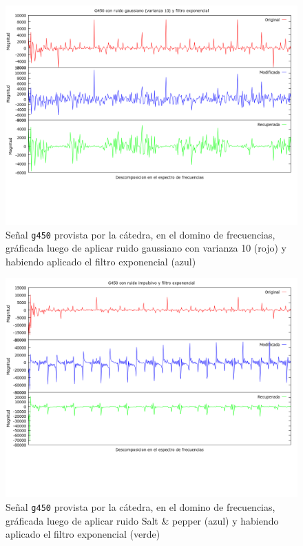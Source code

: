 \begin{figure}[H]
\begin {center}
\includegraphics[width=500pt]{imagenes/g450-gauss-10-exp.png}
\end {center}
\caption{Se\~nal \texttt{g450} provista por la c\'atedra, en el domino de frecuencias, gr\'aficada
luego de aplicar ruido gaussiano con varianza 10 (rojo) y 
habiendo aplicado el filtro exponencial (azul)}
\label{fig:GexpSpec}
\end{figure}

\begin{figure}[H]
\begin {center}
\includegraphics[width=500pt]{imagenes/g450-imp-exp.png}
\end {center}
\caption{Se\~nal \texttt{g450} provista por la c\'atedra, en el domino de frecuencias, gr\'aficada
luego de aplicar ruido Salt \& pepper (azul) y habiendo aplicado el filtro exponencial (verde)}
\label{fig:SexpSig}
\end{figure}

